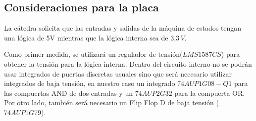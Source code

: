 \subsection{Consideraciones para la placa}
La cátedra solicita que las entradas y salidas de la máquina de estados tengan una lógica de 5V mientras que la lógica interna sea de $3.3\,V$. \par Como primer medida, se utilizará un regulador de tensión($LMS1587CS$) para obtener la tensión para la lógica interna.
Dentro del circuito interno no se podrán usar integrados de puertas discretas usuales sino que será necesario utilizar integrados de baja tensión, en nuestro caso un integrado $74AUP1G08-Q1$ para las compuertas AND de dos entradas y un $74AUP2G32$ para la compuerta OR. Por otro lado, también será necesario un Flip Flop D de baja tensión ($74AUP1G79$). \par

